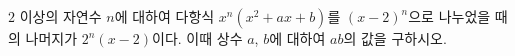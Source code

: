 $2$ 이상의 자연수 $n$에 대하여 다항식 $x^n(x^2+ax+b)$를 $(x-2)^n$으로 나누었을 때의 나머지가 $2^n(x-2)$이다. 이때 상수 $a$, $b$에 대하여 $ab$의 값을 구하시오.
